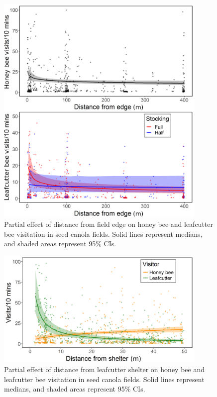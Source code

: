 \documentclass[12pt, draft]{article} %
\begin{document}
\begin{figure}
    \centering
    \includegraphics[width=0.9\textwidth,keepaspectratio=true]{slopeHbeeDist_both.png}
    \caption[Partial effect of distance from field edge on bee visitation in seed canola fields]{Partial effect of distance from field edge on honey bee and leafcutter bee visitation in seed canola fields. Solid lines represent medians, and shaded areas represent 95\% CIs.}
    \label{fig:hbeeDist_both}
\end{figure}


\begin{figure}
    \centering
    \includegraphics[width=0.9\textwidth,keepaspectratio=true]{slopeLbeeDistBothBees.png}
    \caption[Partial effect of distance from leafcutter shelter on bee visitation in seed canola fields]{Partial effect of distance from leafcutter shelter on honey bee and leafcutter bee visitation in seed canola fields. Solid lines represent medians, and shaded areas represent 95\% CIs.}
    \label{fig:lbeeDist_both}
\end{figure} %
\end{document}
